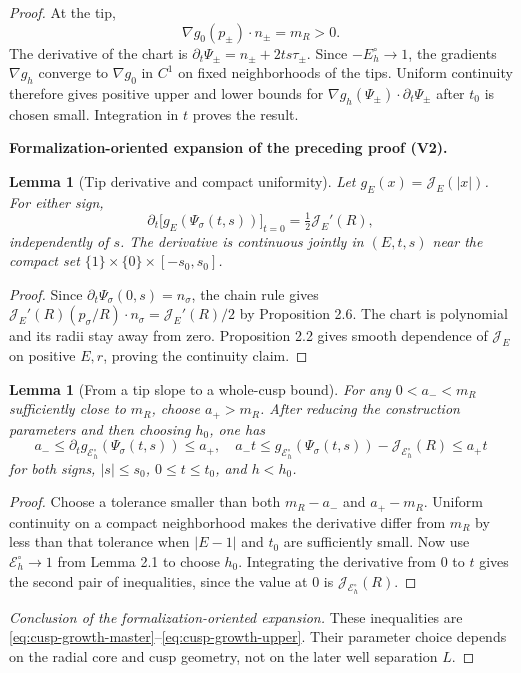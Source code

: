 \documentclass[11pt]{article}
\newtheorem{lemma}[theorem]{Lemma}
\newcommand{\formalisationparentid}{X}
\newenvironment{formalisationaddition}[1]{\par\medskip\begingroup\color{blue}\def\formalisationparentid{#1}\setcounter{formalizationsublemma}{0}\let\lemma\formalizationsublemma\let\endlemma\endformalizationsublemma
  \def\Eo{\mathcal E_h^\circ}\def\EE{\mathcal E_h}\def\phio{\phi_h^\circ}\def\phih{\phi_h}\def\Ho{H_h^{\rm atom}(v^\circ)}\def\Ha{H_h^{\rm atom}}\def\HL{H_h^{L}}\def\Dh{D_h}\def\Log{\operatorname{Log}}\def\ellh{\ell_h}\def\Gp{G_{p,h}}\def\Ast{A_{*,h}}\def\ahat{\widehat{\mathfrak a}_h}\def\ah{\mathfrak a_h}\def\rh{\widehat\rho_h}\def\deltah{\widehat\delta_h}\def\oldref##1{\textup{(##1)}}\def\interface##1{\par\noindent\textit{Analytical interface used here.} ##1\par}\def\finish{\par\noindent\textit{Conclusion of the formalization-oriented expansion.} }\par\noindent\textbf{Formalization-oriented expansion of the preceding proof (V2).}\par\smallskip
}{\par\endgroup\medskip
}
\newcommand{\cJ}{\mathcal J}
\begin{document}
\begin{proof}
At the tip,
\[
 \nabla g_0(p_\pm)\cdot n_\pm=m_R>0.
\]
The derivative of the chart is
$\partial_t\Psi_\pm=n_\pm+2ts\tau_\pm$.  Since
$-E_h^\circ\to1$, the gradients $\nabla g_h$ converge to $\nabla g_0$ in
$C^1$ on fixed neighborhoods of the tips.  Uniform continuity therefore
gives positive upper and lower bounds for
$\nabla g_h(\Psi_\pm)\cdot\partial_t\Psi_\pm$ after $t_0$ is chosen small.
Integration in $t$ proves the result.

\begin{formalisationaddition}{L2.10}
\begin{lemma}[Tip derivative and compact uniformity]\label{sublemma:L2-10-normal-derivative}
Let $g_E(x)=\cJ_E(|x|)$. For either sign,
\[
 \partial_t\big[g_E(\Psi_\sigma(t,s))\big]_{t=0}=\tfrac12\cJ_E'(R),
\]
independently of $s$. The derivative is continuous jointly in $(E,t,s)$ near the compact set $\{1\}\times\{0\}\times[-s_0,s_0]$.
\end{lemma}
\begin{proof}
Since $\partial_t\Psi_\sigma(0,s)=n_\sigma$, the chain rule gives
$\cJ_E'(R)(p_\sigma/R)\cdot n_\sigma=\cJ_E'(R)/2$ by Proposition 2.6. The chart is polynomial and its radii stay away from zero. Proposition 2.2 gives smooth dependence of $\cJ_E$ on positive $E,r$, proving the continuity claim.
\end{proof}

\begin{lemma}[From a tip slope to a whole-cusp bound]\label{sublemma:L2-10-integrated-slope}
For any $0<a_-<m_R$ sufficiently close to $m_R$, choose $a_+>m_R$. After reducing the construction parameters and then choosing $h_0$, one has
\[
 a_-\le\partial_t g_{\Eo}(\Psi_\sigma(t,s))\le a_+,
\quad
 a_-t\le g_{\Eo}(\Psi_\sigma(t,s))-\cJ_{\Eo}(R)\le a_+t
\]
for both signs, $|s|\le s_0$, $0\le t\le t_0$, and $h<h_0$.
\end{lemma}
\begin{proof}
Choose a tolerance smaller than both $m_R-a_-$ and $a_+-m_R$. Uniform continuity on a compact neighborhood makes the derivative differ from $m_R$ by less than that tolerance when $|E-1|$ and $t_0$ are sufficiently small. Now use $\Eo\to1$ from Lemma 2.1 to choose $h_0$. Integrating the derivative from $0$ to $t$ gives the second pair of inequalities, since the value at $0$ is $\cJ_{\Eo}(R)$.
\end{proof}
\finish These inequalities are \eqref{eq:cusp-growth-master}--\eqref{eq:cusp-growth-upper}. Their parameter choice depends on the radial core and cusp geometry, not on the later well separation $L$.
\end{formalisationaddition}

\end{proof}
\end{document}
